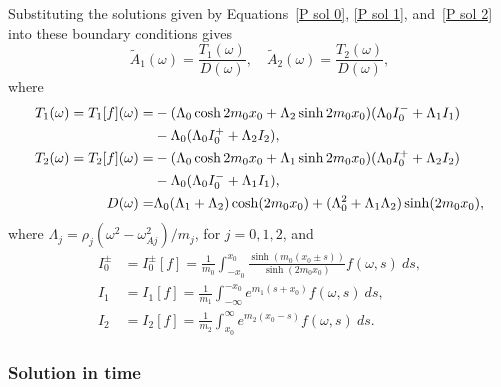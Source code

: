 \documentclass[12pt]{../style-files/ociamthesis}
\begin{document}
Substituting the solutions given by Equations~\eqref{P sol 0}, \eqref{P sol 1}, and~\eqref{P sol 2} into these boundary conditions gives
\begin{equation}
\tilde{A}_1(\omega) = \frac{T_1(\omega)}{D(\omega)}, \quad \tilde{A}_2(\omega) = \frac{T_2(\omega)}{D(\omega)},
\end{equation}
where
\begin{align}
T_1(\omega) = T_1[f](\omega) = & -(\Lambda_0\cosh{2m_0 x_0} + \Lambda_2\sinh{2m_0 x_0})(\Lambda_0 I_0^- + \Lambda_1 I_1) \notag \\
& - \Lambda_0(\Lambda_0 I_0^+ + \Lambda_2 I_2), \\
T_2(\omega) = T_2[f](\omega) = & - (\Lambda_0\cosh{2m_0 x_0} + \Lambda_1\sinh{2m_0 x_0})(\Lambda_0 I_0^+ + \Lambda_2 I_2) \notag \\
& -\Lambda_0(\Lambda_0 I_0^- + \Lambda_1 I_1), \\
D(\omega) = & \Lambda_0(\Lambda_1 + \Lambda_2)\cosh(2m_0x_0) + (\Lambda_0^2 + \Lambda_1\Lambda_2)\sinh(2m_0x_0),
\label{D}
\end{align}
where $\Lambda_j = \rho_j (\omega^2 - \omega_{Aj}^2) /  m_j$, for $j = 0, 1, 2$, and
\begin{align}
I_0^\pm &= I_0^\pm[f] = \frac{1}{m_0} \int_{-x_0}^{x_0} \frac{\sinh(m_0(x_0 \pm s))}{\sinh(2m_0x_0)} f(\omega, s) ~ds, \\
I_1 &= I_1[f] = \frac{1}{m_1} \int_{-\infty}^{-x_0} e^{m_1(s + x_0)} f(\omega, s) ~ds, \\
I_2 &= I_2[f] = \frac{1}{m_2} \int_{x_0}^\infty e^{m_2(x_0 - s)} f(\omega, s) ~ds.
\end{align}


\subsubsection{Solution in time}
\end{document}
